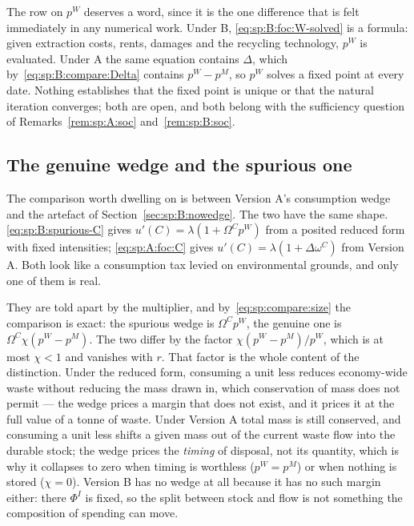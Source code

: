 The row on $p^W$ deserves a word, since it is the one difference that is felt immediately in any
numerical work. Under B, \eqref{eq:sp:B:foc:W-solved} is a formula: given extraction costs, rents,
damages and the recycling technology, $p^W$ is evaluated. Under A the same equation contains $\Delta$,
which by~\eqref{eq:sp:B:compare:Delta} contains $p^W-p^M$, so $p^W$ solves a fixed point at every
date. Nothing establishes that the fixed point is unique or that the natural iteration converges; both
are open, and both belong with the sufficiency question of Remarks~\ref{rem:sp:A:soc}
and~\ref{rem:sp:B:soc}.


\subsection{The genuine wedge and the spurious one}\label{sec:sp:compare:wedges}

The comparison worth dwelling on is between Version A's consumption wedge and the artefact of
Section~\ref{sec:sp:B:nowedge}. The two have the same shape.
\eqref{eq:sp:B:spurious-C} gives $u'(C)=\lambda\left(1+\Omega^Cp^W\right)$ from a posited reduced form
with fixed intensities; \eqref{eq:sp:A:foc:C} gives $u'(C)=\lambda\left(1+\Delta\omega^C\right)$ from
Version A. Both look like a consumption tax levied on environmental grounds, and only one of them is
real.

They are told apart by the multiplier, and by~\eqref{eq:sp:compare:size} the comparison is exact: the
spurious wedge is $\Omega^Cp^W$, the genuine one is $\Omega^C\chi\left(p^W-p^M\right)$. The two differ
by the factor $\chi\left(p^W-p^M\right)/p^W$, which is at most $\chi<1$ and vanishes with $r$. That
factor is the whole content of the distinction. Under the reduced form, consuming a unit less reduces
economy-wide waste without reducing the mass drawn in, which conservation of mass does not permit ---
the wedge prices a margin that does not exist, and it prices it at the full value of a tonne of waste.
Under Version A total mass is still conserved, and consuming a unit less shifts a given mass out of
the current waste flow into the durable stock; the wedge prices the \emph{timing} of disposal, not its
quantity, which is why it collapses to zero when timing is worthless ($p^W=p^M$) or when nothing is
stored ($\chi=0$). Version B has no wedge at all because it has no such margin either: there $\Phi^I$
is fixed, so the split between stock and flow is not something the composition of spending can move.


